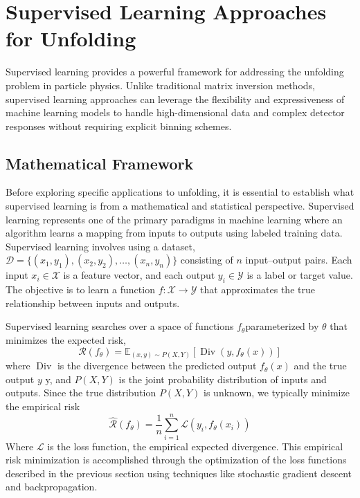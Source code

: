 \section{Supervised Learning Approaches for Unfolding}
    Supervised learning provides a powerful framework for addressing the unfolding problem in particle physics. 
    Unlike traditional matrix inversion methods, supervised learning approaches can leverage the flexibility and expressiveness of machine learning models to handle high-dimensional data and complex detector responses without requiring explicit binning schemes.
    \subsection{Mathematical Framework}
        Before exploring specific applications to unfolding, it is essential to establish what supervised learning is from a mathematical and statistical perspective.
        Supervised learning represents one of the primary paradigms in machine learning where an algorithm learns a mapping from inputs to outputs using labeled training data.
        Supervised learning involves using a dataset, \(\mathcal{D} = \{(x_1, y_1), (x_2, y_2), \ldots, (x_n, y_n)\}\) consisting of \(n\) input--output pairs.
        Each input \(x_i \in \mathcal{X}\) is a feature vector, and each output \(y_i \in \mathcal{Y}\) is a label or target value.
        The objective is to learn a function \(f: \mathcal{X} \rightarrow \mathcal{Y}\) that approximates the true relationship between inputs and outputs.
    
        Supervised learning searches over a space of functions \(f_\theta\)parameterized by \(\theta\) that minimizes the expected risk,
        \begin{equation}\mathcal{R}(f_\theta) = \mathbb{E}_{(x,y) \sim P(X,Y)}[\operatorname{Div}(y, f_\theta(x))]
        \end{equation}
        where \(\operatorname{Div}\) is the divergence between the predicted output \(f_\theta(x)\) and the true output \(y\) y, and \(P(X,Y)\) is the joint probability distribution of inputs and outputs.
        Since the true distribution \(P(X,Y)\) is unknown, we typically minimize the empirical risk
        \begin{equation}
        \hat{\mathcal{R}}(f_\theta) = \frac{1}{n}\sum_{i=1}^{n}\mathcal{L}(y_i, f_\theta(x_i))
        \end{equation}
        Where \(\mathcal{L}\) is the loss function, the empirical expected divergence.
        This empirical risk minimization is accomplished through the optimization of the loss functions described in the previous section using techniques like stochastic gradient descent and backpropagation.
